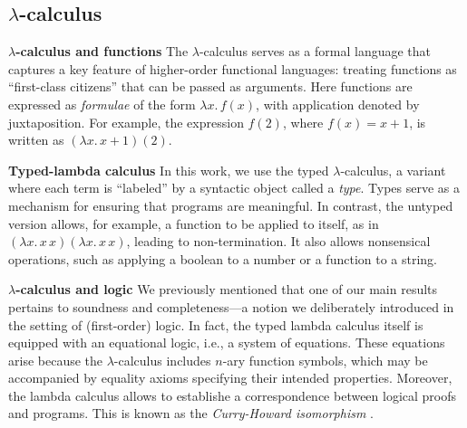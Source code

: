 


\subsection*{ $\lambda$-calculus}
\noindent \textbf{$\lambda$-calculus and functions}
The $\lambda$-calculus serves as a formal language that captures a key feature of higher-order functional languages: treating functions as ``first-class citizens'' that can be passed as arguments. Here functions are expressed as \emph{formulae} of the form $\lambda x.\,f(x)$, with application denoted by juxtaposition. For example, the expression $f(2)$, where $f(x) = x + 1$, is written as $(\lambda x.\,x + 1)(2)$.

\noindent \textbf{Typed-lambda calculus}
In this work, we use the typed $\lambda$-calculus, a variant where each term is ``labeled'' by a syntactic object called a \emph{type}. Types serve as a mechanism for ensuring that programs are meaningful. In contrast, the untyped version allows, for example, a function to be applied to itself, as in $(\lambda x.\,x\,x)(\lambda x.\,x\,x)$, leading to non-termination. It also allows nonsensical operations, such as applying a boolean to a number or a function to a string.



\noindent \textbf{$\lambda$-calculus and logic} 
We previously mentioned that one of our main results pertains to soundness and completeness---a notion we deliberately introduced in the setting of (first-order) logic. In fact, the typed lambda calculus itself is equipped with an equational logic, i.e., a system of equations. These equations arise because the $\lambda$-calculus includes $n$-ary function symbols, which may be accompanied by equality axioms specifying their  intended properties. Moreover, the lambda calculus allows to establishe a correspondence between logical proofs and programs. This is known as the \emph{Curry-Howard isomorphism} \cite{girardProofsTypes1989}.

 

